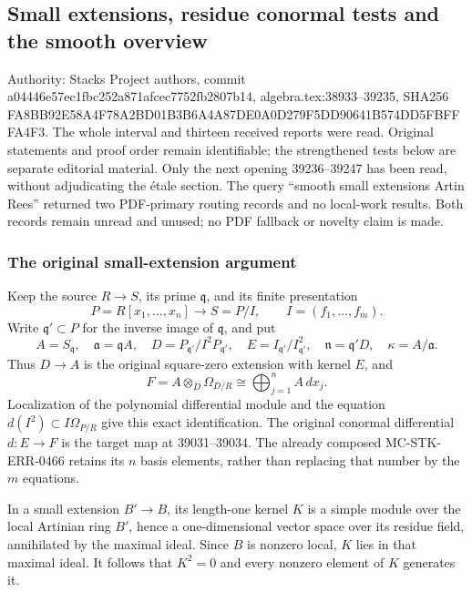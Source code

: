 \subsection{Small extensions, residue conormal tests and the smooth overview}\label{small-extensions-residue-conormal-tests-and-the-smooth-overview}

Authority: Stacks Project authors, commit a04446e57ec1fbc252a871afcec7752fb2807b14, algebra.tex:38933--39235, SHA256 FA8BB92E58A4F78A2BD01B3B6A4A87DE0A0D279F5DD90641B574DD5FBFFFA4F3. The whole interval and thirteen received reports were read. Original statements and proof order remain identifiable; the strengthened tests below are separate editorial material. Only the next opening 39236--39247 has been read, without adjudicating the étale section. The query ``smooth small extensions Artin Rees'' returned two PDF-primary routing records and no local-work results. Both records remain unread and unused; no PDF fallback or novelty claim is made.

\subsubsection{The original small-extension argument}\label{the-original-small-extension-argument}

Keep the source \(R\to S\), its prime \(\mathfrak q\), and its finite presentation \[
P=R[x_1,\ldots,x_n]\longrightarrow S=P/I,\qquad
I=(f_1,\ldots,f_m).
\] Write \(\mathfrak q'\subset P\) for the inverse image of \(\mathfrak q\), and put \[
A=S_{\mathfrak q},\quad \mathfrak a=\mathfrak q A,\quad
D=P_{\mathfrak q'}/I^2P_{\mathfrak q'},\quad
E=I_{\mathfrak q'}/I_{\mathfrak q'}^2,\quad
\mathfrak n=\mathfrak q'D,\quad \kappa=A/\mathfrak a.
\] Thus \(D\to A\) is the original square-zero extension with kernel \(E\), and \[
F=A\otimes_D\Omega_{D/R}\cong
\bigoplus_{j=1}^n A\,dx_j.
\] Localization of the polynomial differential module and the equation \(d(I^2)\subset I\Omega_{P/R}\) give this exact identification. The original conormal differential \(d:E\to F\) is the target map at 39031--39034. The already composed MC-STK-ERR-0466 retains its \(n\) basis elements, rather than replacing that number by the \(m\) equations.

In a small extension \(B'\to B\), its length-one kernel \(K\) is a simple module over the local Artinian ring \(B'\), hence a one-dimensional vector space over its residue field, annihilated by the maximal ideal. Since \(B\) is nonzero local, \(K\) lies in that maximal ideal. It follows that \(K^2=0\) and every nonzero element of \(K\) generates it.

